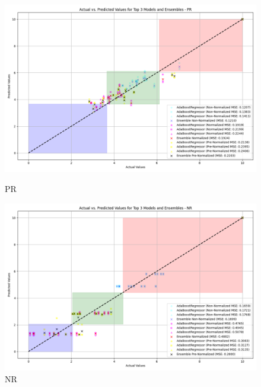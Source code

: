 \begin{figure}[H]
    \centering
    \begin{minipage}{0.45\textwidth}
        \centering
        \includegraphics[width=\linewidth]{reg_section_all/ensemble_learning/actual_vs_predicted_top_3_models_and_ensembles_PR.png}
        \caption{PR}
        \label{reg_all_fig:pr_ensemble}
    \end{minipage}\hfill
    \begin{minipage}{0.45\textwidth}
        \centering
        \includegraphics[width=\linewidth]{reg_section_all/ensemble_learning/actual_vs_predicted_top_3_models_and_ensembles_NR.png}
        \caption{NR}
        \label{reg_all_fig:nr_ensemble}
    \end{minipage}
\end{figure}


